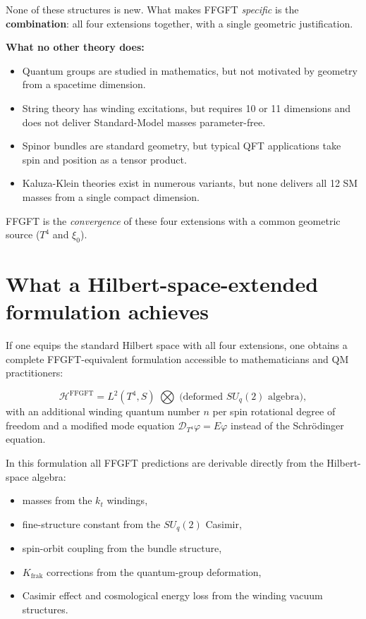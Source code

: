 None of these structures is new. What makes FFGFT \emph{specific} is
the \textbf{combination}: all four extensions together, with a
single geometric justification.

\textbf{What no other theory does:}
\begin{itemize}[leftmargin=2em,itemsep=2pt,topsep=2pt]
  \item Quantum groups are studied in mathematics, but not motivated
        by geometry from a spacetime dimension.
  \item String theory has winding excitations, but requires 10 or
        11 dimensions and does not deliver Standard-Model masses
        parameter-free.
  \item Spinor bundles are standard geometry, but typical QFT
        applications take spin and position as a tensor product.
  \item Kaluza-Klein theories exist in numerous variants, but none
        delivers all 12 SM masses from a single compact dimension.
\end{itemize}

FFGFT is the \emph{convergence} of these four extensions with a
common geometric source ($T^4$ and $\xi_0$).

\section{What a Hilbert-space-extended formulation achieves}

If one equips the standard Hilbert space with all four extensions, one
obtains a complete FFGFT-equivalent formulation accessible to
mathematicians and QM practitioners:

\begin{equation}
  \mathcal{H}^{\text{FFGFT}}
  = L^2(T^4, S) \;\bigotimes\; \text{(deformed $SU_q(2)$ algebra)},
\end{equation}
with an additional winding quantum number $n$ per spin rotational
degree of freedom and a modified mode equation
$\mathcal{D}_{T^4}\varphi = E \varphi$ instead of the Schrödinger
equation.

In this formulation all FFGFT predictions are derivable directly
from the Hilbert-space algebra:
\begin{itemize}[leftmargin=2em,itemsep=2pt,topsep=2pt]
  \item masses from the $k_t$ windings,
  \item fine-structure constant from the $SU_q(2)$ Casimir,
  \item spin-orbit coupling from the bundle structure,
  \item $K_{\text{frak}}$ corrections from the quantum-group
        deformation,
  \item Casimir effect and cosmological energy loss from the winding
        vacuum structures.
\end{itemize}

